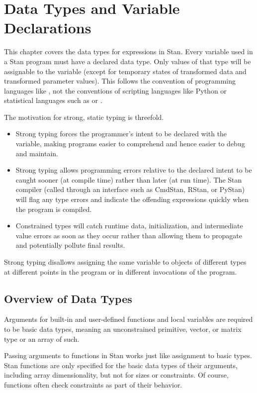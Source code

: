 \chapter{Data Types and Variable Declarations}\label{data-types.chapter}

\noindent
This chapter covers the data types for expressions in Stan.  Every
variable used in a Stan program must have a declared data type.  Only
values of that type will be assignable to the variable (except for
temporary states of transformed data and transformed parameter
values).  This follows the convention of programming languages like
\Cpp, not the conventions of scripting languages like Python or
statistical languages such as \R or \BUGS.

The motivation for strong, static typing is threefold.
%
\begin{itemize}
\item Strong typing forces the programmer's intent to be declared with
  the variable, making programs easier to comprehend and hence easier
  to debug and maintain.
\item Strong typing allows programming errors relative to the declared
  intent to be caught sooner (at compile time) rather than later (at
  run time).  The Stan compiler (called through an interface such as
  CmdStan, RStan, or PyStan) will flag any type errors and indicate
  the offending expressions quickly when the program is compiled.
\item Constrained types will catch runtime data, initialization, and
  intermediate value errors as soon as they occur rather than allowing
  them to propagate and potentially pollute final results.
\end{itemize}
%
Strong typing disallows assigning the same variable to objects of
different types at different points in the program or in different
invocations of the program.

\section{Overview of Data Types}

Arguments for built-in and user-defined functions and local variables
are required to be basic data types, meaning an unconstrained
primitive, vector, or matrix type or an array of such.

Passing arguments to functions in Stan works just like assignment to
basic types.  Stan functions are only specified for the basic data
types of their arguments, including array dimensionality, but not for
sizes or constraints.  Of course, functions often check constraints as
part of their behavior.  

